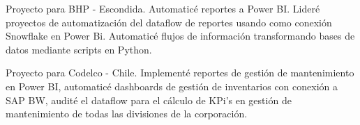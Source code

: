 \documentclass[10pt,a4paper,ragged2e,withhyper,academicons]{altacv}
\begin{document}
\begin{paracol}{2}

{\justify Proyecto para BHP - Escondida. Automatic\'e reportes a Power BI. 
Lider\'e proyectos de automatizaci\'on del dataflow de reportes usando como conexi\'on Snowflake en Power Bi. 
Automatic\'e flujos de informaci\'on transformando bases de datos mediante scripts en Python}.\\
{}

\divider
\smallskip

{\justify Proyecto para Codelco - Chile. 
Implement\'e reportes de gesti\'on de mantenimiento en Power BI, automatic\'e dashboards de gesti\'on de inventarios con conexi\'on
a SAP BW, audit\'e el dataflow para el c\'alculo de KPi's en gesti\'on de mantenimiento de todas las divisiones de la corporaci\'on.}\\
{}

\divider
\smallskip






\end{paracol}
\end{document}
